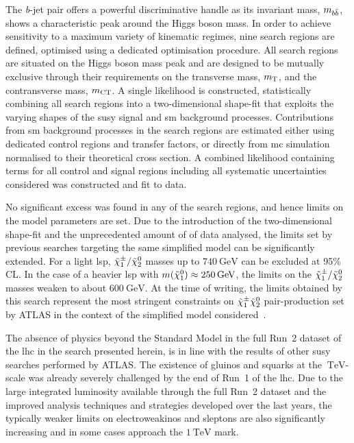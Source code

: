 The \textit{b}-jet pair offers a powerful discriminative handle as its invariant mass, $m_{b\bar{b}}$, shows a characteristic peak around the Higgs boson mass. In order to achieve sensitivity to a maximum variety of kinematic regimes, nine search regions are defined, optimised using a dedicated optimisation procedure. All search regions are situated on the Higgs boson mass peak and are designed to be mutually exclusive through their requirements on the transverse mass, $m_{\textrm{T}}$, and the contransverse mass, $m_{\textrm{CT}}$. A single likelihood is constructed, statistically combining all search regions into a two-dimensional shape-fit that exploits the varying shapes of the \gls{susy} signal and \gls{sm} background processes. Contributions from \gls{sm} background processes in the search regions are estimated either using dedicated control regions and transfer factors, or directly from \gls{mc} simulation normalised to their theoretical cross section. A combined likelihood containing terms for all control and signal regions including all systematic uncertainties considered was constructed and fit to data. 

No significant excess was found in any of the search regions, and hence limits on the model parameters are set. Due to the introduction of the two-dimensional shape-fit and the unprecedented amount of \onethirtynineifb of data analysed, the limits set by previous searches targeting the same simplified model can be significantly extended. For a light \gls{lsp}, $\tilde{\chi}_1^\pm/\tilde{\chi}_2^0$ masses up to $\SI{740}{\GeV}$ can be excluded at 95\% CL. In the case of a heavier \gls{lsp} with $m(\lsp)\approx\SI{250}{\GeV}$, the limits on the $\tilde{\chi}_1^\pm/\tilde{\chi}_2^0$ masses weaken to about $\SI{600}{\GeV}$. At the time of writing, the limits obtained by this search represent the most stringent constraints on $\tilde{\chi}_1^\pm\tilde{\chi}_2^0$ pair-production set by ATLAS in the context of the simplified model considered~\cite{ATL-PHYS-PUB-2020-020}.

The absence of physics beyond the Standard Model in the full Run~2 dataset of the \gls{lhc} in the search presented herein, is in line with the results of other \gls{susy} searches performed by ATLAS. The existence of gluinos and squarks at the $\SI{}{\TeV}$-scale was already severely challenged by the end of Run~1 of the \gls{lhc}. Due to the large integrated luminosity available through the full Run~2 dataset and the improved analysis techniques and strategies developed over the last years, the typically weaker limits on electroweakinos and sleptons are also significantly increasing and in some cases approach the $\SI{1}{\TeV}$ mark. 

